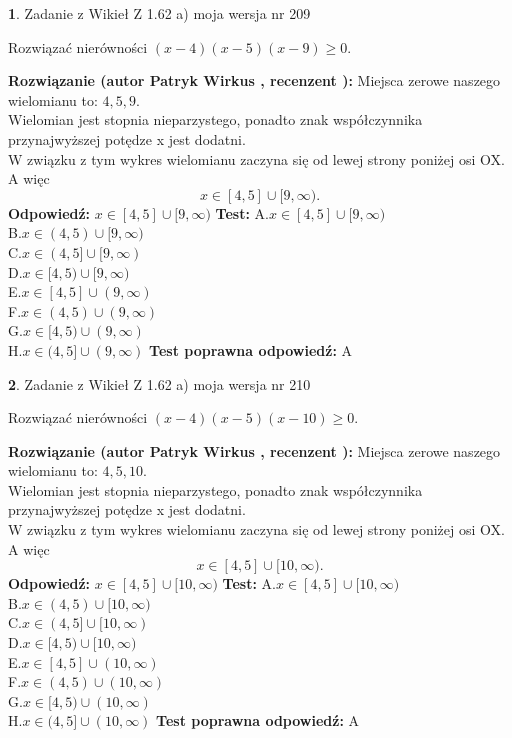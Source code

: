 \documentclass[12pt, a4paper]{article}
\theoremstyle{definition} %
\newtheorem{zad}{}
\newcommand{\zadStart}[1]{\begin{zad}#1\newline}
\newcommand{\zadStop}{\end{zad}}
\newcommand{\rozwStart}[2]{\noindent \textbf{Rozwiązanie (autor #1 , recenzent #2): }\newline}
\newcommand{\rozwStop}{\newline}
\newcommand{\odpStart}{\noindent \textbf{Odpowiedź:}\newline}
\newcommand{\odpStop}{\newline}
\newcommand{\testStart}{\noindent \textbf{Test:}\newline}
\newcommand{\testStop}{\newline}
\newcommand{\kluczStart}{\noindent \textbf{Test poprawna odpowiedź:}\newline}
\newcommand{\kluczStop}{\newline}
\begin{document}
\zadStart{Zadanie z Wikieł Z 1.62 a) moja wersja nr 209}

Rozwiązać nierówności $(x-4)(x-5)(x-9)\ge0$.
\zadStop
\rozwStart{Patryk Wirkus}{}
Miejsca zerowe naszego wielomianu to: $4, 5, 9$.\\
Wielomian jest stopnia nieparzystego, ponadto znak współczynnika przy\linebreak najwyższej potędze x jest dodatni.\\ W związku z tym wykres wielomianu zaczyna się od lewej strony poniżej osi OX. A więc $$x \in [4,5] \cup [9,\infty).$$
\rozwStop
\odpStart
$x \in [4,5] \cup [9,\infty)$
\odpStop
\testStart
A.$x \in [4,5] \cup [9,\infty)$\\
B.$x \in (4,5) \cup [9,\infty)$\\
C.$x \in (4,5] \cup [9,\infty)$\\
D.$x \in [4,5) \cup [9,\infty)$\\
E.$x \in [4,5] \cup (9,\infty)$\\
F.$x \in (4,5) \cup (9,\infty)$\\
G.$x \in [4,5) \cup (9,\infty)$\\
H.$x \in (4,5] \cup (9,\infty)$
\testStop
\kluczStart
A
\kluczStop



\zadStart{Zadanie z Wikieł Z 1.62 a) moja wersja nr 210}

Rozwiązać nierówności $(x-4)(x-5)(x-10)\ge0$.
\zadStop
\rozwStart{Patryk Wirkus}{}
Miejsca zerowe naszego wielomianu to: $4, 5, 10$.\\
Wielomian jest stopnia nieparzystego, ponadto znak współczynnika przy\linebreak najwyższej potędze x jest dodatni.\\ W związku z tym wykres wielomianu zaczyna się od lewej strony poniżej osi OX. A więc $$x \in [4,5] \cup [10,\infty).$$
\rozwStop
\odpStart
$x \in [4,5] \cup [10,\infty)$
\odpStop
\testStart
A.$x \in [4,5] \cup [10,\infty)$\\
B.$x \in (4,5) \cup [10,\infty)$\\
C.$x \in (4,5] \cup [10,\infty)$\\
D.$x \in [4,5) \cup [10,\infty)$\\
E.$x \in [4,5] \cup (10,\infty)$\\
F.$x \in (4,5) \cup (10,\infty)$\\
G.$x \in [4,5) \cup (10,\infty)$\\
H.$x \in (4,5] \cup (10,\infty)$
\testStop
\kluczStart
A
\kluczStop
\end{document}
